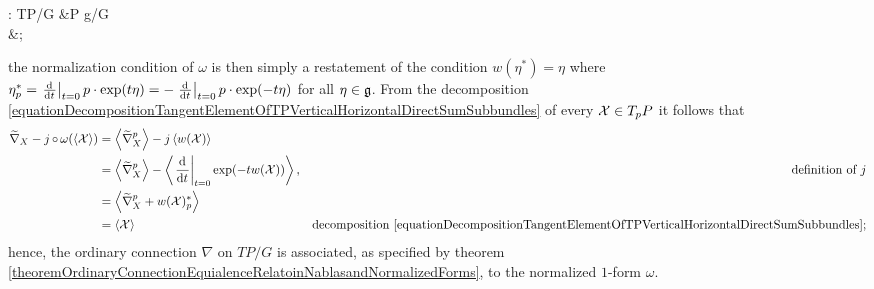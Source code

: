 \begin{example}
\begin{eqnsplit}
    \omega: TP/G &\to P \times \alg g/G \\
         &\mapsto {};
\end{eqnsplit}
the normalization condition of $\omega$ is then simply a restatement of the condition $w(\eta^*) = \eta$ where $\eta^*_p = \der{t}[t=0]{p \cdot \exp(t \eta)} = - \der{t}[t=0]{p \cdot \exp(-t \eta)}$ for all $\eta \in \mathfrak{g}$. From the decomposition \eqref{equationDecompositionTangentElementOfTPVerticalHorizontalDirectSumSubbundles} of every $\mathcal{X} \in T_pP$ it follows that
\begin{align*}
    \tilde \nabla_{X} - j \comp \omega(\cl{\ppal X}) 
        &=  \cl{\tilde \nabla^p_X} - j\cl{w(\ppal X)} \\
        &=  \cl{\tilde \nabla^p_X} - \cl{\der{t}[t=0]{\exp(-t w(\ppal X))}},& \text{definition of $j$} \\
        &= \cl{ \tilde \nabla^p_X + w(\ppal X)^*_p}\\
        &= \cl{\ppal X} & \text{decomposition  \eqref{equationDecompositionTangentElementOfTPVerticalHorizontalDirectSumSubbundles}};
\end{align*}
hence, the ordinary connection $\nabla$ on $TP/G$ is associated, as specified by theorem \ref{theoremOrdinaryConnectionEquialenceRelatoinNablasandNormalizedForms}, to the normalized $1$-form $\omega$.
\end{example}

